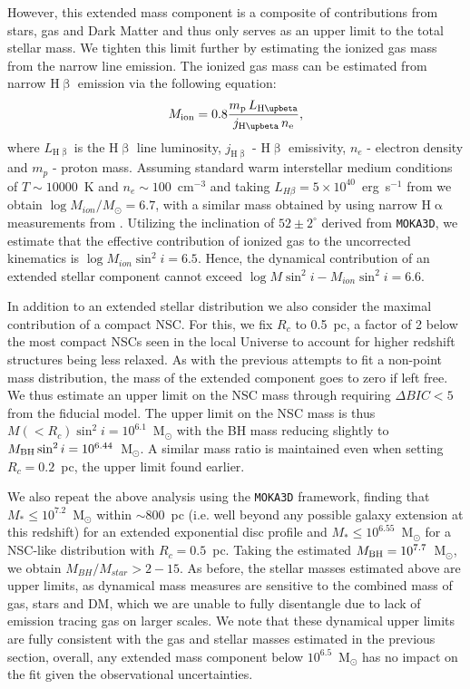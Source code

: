 \documentclass[twocolumn, fleqn]{doc_class}
\newcommand{\Halpha}{\ensuremath{\mathrm{H}\upalpha}\xspace}
\newcommand{\Hbeta}{\ensuremath{\mathrm{H}\upbeta}\xspace}
\begin{document}
However, this extended mass component is a composite of contributions from stars, gas and Dark Matter and thus only serves as an upper limit to the total stellar mass. We tighten this limit further by estimating the ionized gas mass from the narrow line emission. The ionized gas mass can be estimated from narrow \Hbeta emission via the following equation:
\begin{equation}
    \label{eq:mion}
    M_{\rm ion} = 0.8\frac{m_{\rm p} \, L_{\Hbeta}}{j_{\Hbeta}\,n_{\rm e}},
\end{equation}
where $L_{\Hbeta}$ is the \Hbeta line luminosity, $j_{\Hbeta}$ - \Hbeta emissivity, $n_e$ - electron density and $m_p$ - proton mass. Assuming standard warm interstellar medium conditions of $T \sim 10000$~K and $n_e \sim 100$~cm$^{-3}$ and taking $L_{H\beta} =  5\times 10^{40}$~erg~s$^{-1}$ from  we obtain $\log{M_{ion}/M_{\odot}} = 6.7$, with a similar mass obtained by using narrow \Halpha measurements from . Utilizing the inclination of $52 \pm 2^{\circ}$ derived from \texttt{MOKA3D}, we estimate that the effective contribution of ionized gas to the uncorrected kinematics is $\log{M_{ion}\sin^2{i}} = 6.5$. Hence, the dynamical contribution of an extended stellar component cannot exceed $\log{M\sin^2{i} - M_{ion}\sin^2{i}} = 6.6$.

In addition to an extended stellar distribution we also consider the maximal contribution of a compact NSC. For this, we fix $R_c$ to 0.5~pc, a factor of 2 below the most compact NSCs seen in the local Universe  to account for higher redshift structures being less relaxed. As with the previous attempts to fit a non-point mass distribution, the mass of the extended component goes to zero if left free. We thus estimate an upper limit on the NSC mass through requiring $\Delta BIC <5$ from the fiducial model. The upper limit on the NSC mass is thus $M(<R_c)\sin^2{i} = 10^{6.1}$~M$_{\odot}$ with the BH mass reducing slightly to $M_{\rm BH}\sin^2{i} = 10^{6.44}$~M$_{\odot}$. A similar mass ratio is maintained even when setting $R_c = 0.2$~pc, the upper limit found earlier.

We also repeat the above analysis using the \texttt{MOKA3D} framework, finding that $M_{*} \leq 10^{7.2}$~M$_{\odot}$ within $\sim$800~pc (i.e. well beyond any possible galaxy extension at this redshift) for an extended exponential disc profile and $M_{*} \leq 10^{6.55}$~M$_{\odot}$ for a NSC-like distribution with $R_c = 0.5$~pc. Taking the estimated $M_{\rm BH} = 10^{7.7}$~M$_{\odot}$, we obtain $M_{BH}/M_{star} > 2 - 15$. As before, the stellar masses estimated above are  upper limits, as dynamical mass measures are sensitive to the combined mass of gas, stars and DM, which we are unable to fully disentangle due to lack of emission tracing gas on larger scales. We note that these dynamical upper limits are fully consistent with the gas and stellar masses estimated in the previous section, overall, any extended mass component below $10^{6.5}$~M$_{\odot}$ has no impact on the fit given the observational uncertainties.
\end{document}
